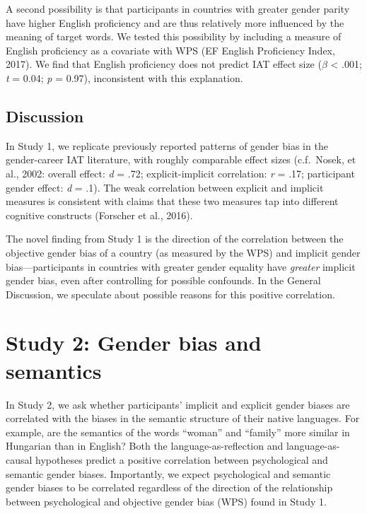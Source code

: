 \documentclass[10pt, letterpaper]{article}
\begin{document}
A second possibility is that participants in countries with greater
gender parity have higher English proficiency and are thus relatively
more influenced by the meaning of target words. We tested this
possibility by including a measure of English proficiency as a covariate
with WPS (EF English Proficiency Index, 2017). We find that English
proficiency does not predict IAT effect size (\(\beta\) \textless{}
.001; \emph{t} = 0.04; \emph{p} = 0.97), inconsistent with this
explanation.

\subsection{Discussion}\label{discussion}

In Study 1, we replicate previously reported patterns of gender bias in
the gender-career IAT literature, with roughly comparable effect sizes
(c.f.~Nosek, et al., 2002: overall effect: \emph{d} = .72;
explicit-implicit correlation: \emph{r} = .17; participant gender
effect: \emph{d} = .1). The weak correlation between explicit and
implicit measures is consistent with claims that these two measures tap
into different cognitive constructs (Forscher et al., 2016).

The novel finding from Study 1 is the direction of the correlation
between the objective gender bias of a country (as measured by the WPS)
and implicit gender bias---participants in countries with greater gender
equality have \emph{greater} implicit gender bias, even after
controlling for possible confounds. In the General Discussion, we
speculate about possible reasons for this positive correlation.

\section{Study 2: Gender bias and
semantics}\label{study-2-gender-bias-and-semantics}

In Study 2, we ask whether participants' implicit and explicit gender
biases are correlated with the biases in the semantic structure of their
native languages. For example, are the semantics of the words ``woman''
and ``family'' more similar in Hungarian than in English? Both the
language-as-reflection and language-as-causal hypotheses predict a
positive correlation between psychological and semantic gender biases.
Importantly, we expect psychological and semantic gender biases to be
correlated regardless of the direction of the relationship between
psychological and objective gender bias (WPS) found in Study 1.
\end{document}
